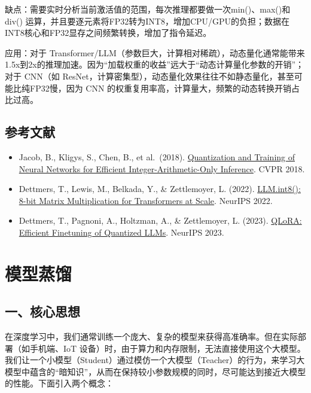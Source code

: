 缺点：需要实时分析当前激活值的范围，每次推理都要做一次min()、max()和div() 运算，并且要逐元素将FP32转为INT8，增加CPU/GPU的负担；数据在INT8核心和FP32显存之间频繁转换，增加了指令延迟。

应用：对于 Transformer/LLM（参数巨大，计算相对稀疏），动态量化通常能带来1.5x到2x的推理加速。因为``加载权重的收益''远大于``动态计算量化参数的开销''；对于 CNN（如 ResNet，计算密集型），动态量化效果往往不如静态量化，甚至可能比纯FP32慢，因为 CNN 的权重复用率高，计算量大，频繁的动态转换开销占比过高。

\hypertarget{ux53c2ux8003ux6587ux732e-88}{%
\subsection{参考文献}\label{ux53c2ux8003ux6587ux732e-88}}

\vspace{0.25em}
\begin{itemize}
\tightlist
\item
  Jacob, B., Kligys, S., Chen, B., et al.~(2018). \href{https://arxiv.org/abs/1712.05877}{Quantization and Training of Neural Networks for Efficient Integer-Arithmetic-Only Inference}. CVPR 2018.
\item
  Dettmers, T., Lewis, M., Belkada, Y., \& Zettlemoyer, L. (2022). \href{https://arxiv.org/abs/2208.07339}{LLM.int8(): 8-bit Matrix Multiplication for Transformers at Scale}. NeurIPS 2022.
\item
  Dettmers, T., Pagnoni, A., Holtzman, A., \& Zettlemoyer, L. (2023). \href{https://arxiv.org/abs/2305.14314}{QLoRA: Efficient Finetuning of Quantized LLMs}. NeurIPS 2023.
\end{itemize}

\clearpage

\hypertarget{ux6a21ux578bux84b8ux998f}{%
\section{模型蒸馏}\label{ux6a21ux578bux84b8ux998f}}

\hypertarget{ux4e00ux6838ux5fc3ux601dux60f3-7}{%
\subsection{一、核心思想}\label{ux4e00ux6838ux5fc3ux601dux60f3-7}}

在深度学习中，我们通常训练一个庞大、复杂的模型来获得高准确率。但在实际部署（如手机端、IoT 设备）时，由于算力和内存限制，无法直接使用这个大模型。我们让一个小模型（Student）通过模仿一个大模型（Teacher）的行为，来学习大模型中蕴含的``暗知识''，从而在保持较小参数规模的同时，尽可能达到接近大模型的性能。下面引入两个概念：

